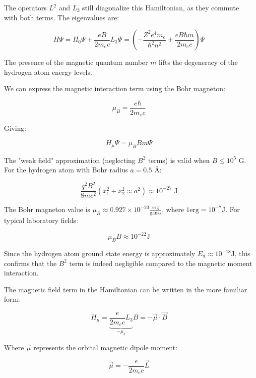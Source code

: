 \documentclass[italian]{HKNdocument}
\begin{document}
The operators $L^2$ and $L_3$ still diagonalize this Hamiltonian, as they commute with both terms. The eigenvalues are:

\begin{equation}
H\Psi=H_0\Psi+\frac{eB}{2m_e c}L_3\Psi=\left(-\frac{Z^2e^4m_e}{\hbar^2n^2}+\frac{eB\hbar m}{2m_e c}\right)\Psi
\end{equation}

The presence of the magnetic quantum number $m$ lifts the degeneracy of the hydrogen atom energy levels.

We can express the magnetic interaction term using the Bohr magneton:

\begin{equation}
\mu_B=\frac{e\hbar}{2m_e c}
\end{equation}

Giving:

\begin{equation}
H_\mu\Psi=\mu_B Bm\Psi
\end{equation}

The "weak field" approximation (neglecting $B^2$ terms) is valid when $B\leq 10^5$ G. For the hydrogen atom with Bohr radius $a=0.5$ Å:

\begin{equation}
\frac{q^2B^2}{8mc^2}(x_1^2+x_2^2\approx a^2)\approx 10^{-27} \text{ J}
\end{equation}


The Bohr magneton value is $\mu_{B} \approx 0.927 \times 10^{-20} \frac{\text{erg}}{\text{gauss}}$, where $1 \text{erg}=10^{-7} \text{J}$. For typical laboratory fields:

\begin{equation}
\mu_{B}B \approx 10^{-22} \text{J}
\end{equation}

Since the hydrogen atom ground state energy is approximately $E_n \approx 10^{-18} \text{J}$, this confirms that the $B^2$ term is indeed negligible compared to the magnetic moment interaction.

The magnetic field term in the Hamiltonian can be written in the more familiar form:

\begin{equation}
H_{\mu}=\underbrace{\frac{e}{2m_e c}L_3}_{-\mu_3}B=-\vec{\mu}\cdot\vec{B}
\end{equation}

Where $\vec{\mu}$ represents the orbital magnetic dipole moment:

\begin{equation}
\vec{\mu}=-\frac{e}{2m_e c}\vec{L}
\end{equation}
\end{document}
